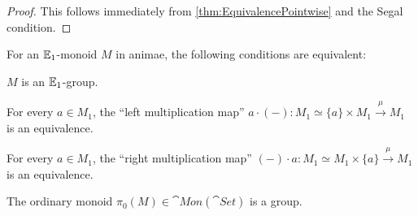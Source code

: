\begin{proof}
	This follows immediately from \cref{thm:EquivalencePointwise} and the Segal condition.
\end{proof}
\begin{lem}\label{lem:E1Groups}
	For an $\mathbb{E}_1$-monoid $M$ in animae, the following conditions are equivalent:
	\begin{alphanumerate}
		\item $M$ is an $\mathbb{E}_1$-group.\label{enum:MIsE1Group}
		\item For every $a\in M_1$, the \enquote{left multiplication map} $a\cdot (-)\colon M_1\simeq \{a\}\times M_1\overset{\mu}{\longrightarrow}M_1$ is an equivalence.\label{enum:MLeftMultiplication}
		\item For every $a\in M_1$, the \enquote{right multiplication map} $(-)\cdot a\colon M_1\simeq M_1\times\{a\}\overset{\mu}{\longrightarrow}M_1$ is an equivalence.\label{enum:MRightMultiplication}
		\item The ordinary monoid $\pi_0(M)\in\cat{Mon}(\cat{Set})$ is a group.\label{enum:MGroupOnPi0}
	\end{alphanumerate}
\end{lem}
